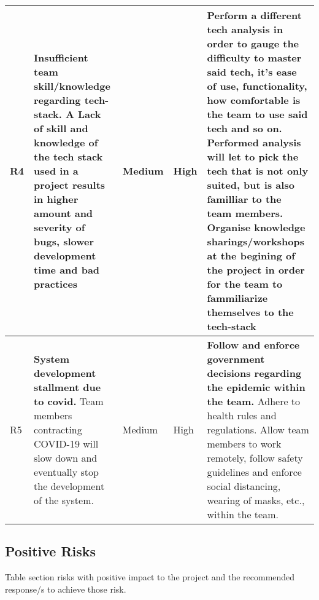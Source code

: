 \documentclass{VUMIFPSkursinis}
\begin{document}
\begin{center}
\begin{longtable}{|C{1cm}|L{4.55cm}|C{2cm}|C{2cm}|L{4.55cm}|}
		R4 &
		\textbf{Insufficient team skill/knowledge regarding tech-stack}. A Lack of skill and knowledge of the tech stack used in a project results in higher amount and severity of bugs, slower development time and bad practices&
		Medium&
		High&
		Perform a different tech analysis in order to gauge the difficulty to master said tech, it's ease of use, functionality, how comfortable is the team to use said tech and so on. Performed analysis will let to pick the tech that is not only suited, but is also familliar to the team members.
		Organise knowledge sharings/workshops at the begining of the project in order for the team to fammiliarize themselves to the tech-stack\\ \hline	
		R5 &
		\textbf{System development stallment due to covid.} Team members contracting COVID-19 will slow down and eventually stop the development of the system.&
		Medium&
		High&
		\textbf{Follow and enforce government decisions regarding the epidemic within the team.} Adhere to health rules and regulations. Allow team members to work remotely, follow safety guidelines and enforce social distancing, wearing of masks, etc., within the team.\\ \hline 			
	\end{longtable}
\end{center}

\subsection{Positive Risks}
Table section risks with positive impact to the project and the recommended response/s to achieve those risk.
\end{document}
